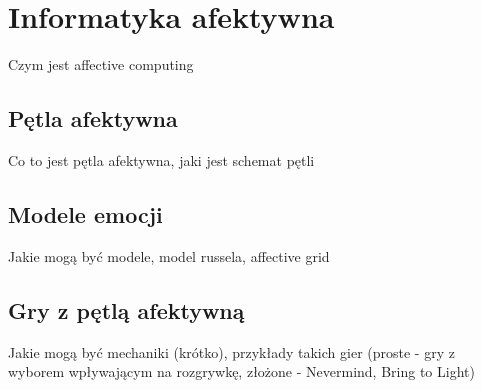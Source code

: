 \chapter{Informatyka afektywna}
\label{cha:affectiveComputing}
Czym jest affective computing
\section{Pętla afektywna}
Co to jest pętla afektywna, jaki jest schemat pętli

\section{Modele emocji}
Jakie mogą być modele, model russela, affective grid

\section{Gry z pętlą afektywną}
Jakie mogą być mechaniki (krótko), przykłady takich gier (proste - gry z wyborem wpływającym na rozgrywkę, złożone - Nevermind, Bring to Light)

